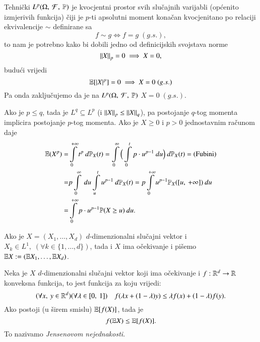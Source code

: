 \begin{nap} \label{nap:5.11-5}
    Tehni\v cki $L^p (\Omega, \: \mathcal{F}, \: \mathbb{P})$ je kvocjentni prostor svih slu\v cajnih varijabli (op\' cenito izmjerivih funkcija) \v ciji je $p$-ti apsolutni moment kona\v can kvocjenitano po relaciji ekvivalencije $\sim$ definirane sa
    \begin{equation*}
        f \sim g \iff f = g \; (g.s.),
    \end{equation*}
    to nam je potrebno kako bi dobili jedno od definicijskih svojstava norme
    \begin{equation*}
        \left\lVert {X} \right\rVert_p = 0 \implies X = 0,
    \end{equation*}
    budu\' ci vrijedi
    \begin{equation*}
        \mathbb{E} [|X|^p] = 0 \implies X = 0 \; (g.s.)
    \end{equation*}
    Pa onda zaklju\v cujemo da je na $L^p (\Omega, \: \mathcal{F}, \: \mathbb{P})$ $X = 0 \; (g.s.)$.
\end{nap}

Ako je $p \leq q$, tada je $L^q \subseteq L^p$ (i $\left\lVert {X} \right\rVert_p \leq \left\lVert {X} \right\rVert_q$), pa postojanje $q$-tog momenta implicira postojanje $p$-tog momenta.
Ako je $X \geq 0$ i $p > 0$ jednostavnim ra\v cunom daje
\begin{align}   \label{jed:5.12}
    \begin{split}
        \mathbb{E}({X^p}) =& \int\limits_0^{+\infty} t^p \: d \mathbb{P}_X (t) = \int\limits_0^{\infty} \Big( \int\limits_0^t p \cdot u^{p - 1} \: d u \Big) \: d \mathbb{P}_X(t) = (\textnormal{Fubini})\\
        =& p \int\limits_0^{\infty} \: du \int\limits_u^t u ^{p-1} \: d \mathbb{P}_X (t) = p \int\limits_0^{+\infty} u^{p-1} \mathbb{P}_X ([{u}, \:{+\infty}]) \: du \\
        =& \int\limits_0^{+\infty} p \cdot u^{p-1} \mathbb{P}({X \geq u}) \: du.
    \end{split}
\end{align}

Ako je $X = (X_1, \ldots, X_d)$ $d$-dimenzionalni slu\v cajni vektor i $X_k \in L^1, \; (\forall k \in \{1, \ldots, d\})$, tada i $X$ ima o\v cekivanje i pi\v semo $\mathbb{E} X := (\mathbb{E} X_1, \ldots, \mathbb{E} X_d)$.

\begin{zad} \label{zad:5.13}
    Neka je $X$ $d$-dimenzionalni slu\v cajni vektor koji ima o\v cekivanje i $f: \mathbb{R}^d \to \mathbb{R}$ konveksna funkcija, to jest funkcija za koju vrijedi:
    \begin{equation*}
        (\forall x, \: y \in \mathbb{R}^d)(\forall \lambda \in [{0}, \:{1}]) \quad f (\lambda x + (1 - \lambda) y) \leq \lambda f(x) + (1 - \lambda) f(y).
    \end{equation*}
    Ako  postoji (u \v sirem smislu) $\mathbb{E} [ f(X) ]$, tada je
    \begin{equation*}
        f (\mathbb{E} X) \leq \mathbb{E} [ f(X) ].
    \end{equation*}
    To nazivamo \emph{Jensenovom nejednakosti}.
\end{zad}

